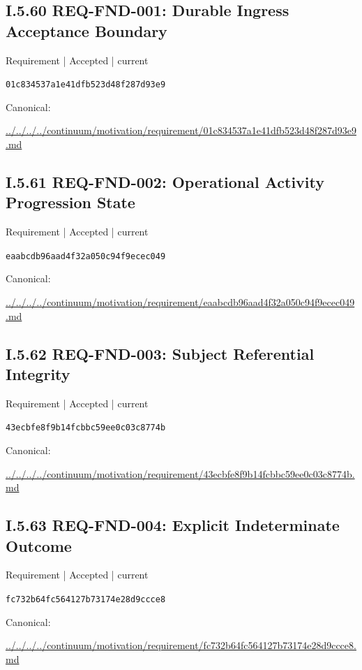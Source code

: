 \documentclass[10pt,a4paper]{article}
\begin{document}
\subsection*{I.5.60 REQ-FND-001: Durable Ingress Acceptance Boundary}
\label{element-01c834537a1e41dfb523d48f287d93e9}
{\small Requirement | Accepted | current}\par
\texttt{01c834537a1e41dfb523d48f287d93e9}\par
Canonical: \par
{\footnotesize\url{../../../../continuum/motivation/requirement/01c834537a1e41dfb523d48f287d93e9.md}}\par
\subsection*{I.5.61 REQ-FND-002: Operational Activity Progression State}
\label{element-eaabcdb96aad4f32a050c94f9ecec049}
{\small Requirement | Accepted | current}\par
\texttt{eaabcdb96aad4f32a050c94f9ecec049}\par
Canonical: \par
{\footnotesize\url{../../../../continuum/motivation/requirement/eaabcdb96aad4f32a050c94f9ecec049.md}}\par
\subsection*{I.5.62 REQ-FND-003: Subject Referential Integrity}
\label{element-43ecbfe8f9b14fcbbc59ee0c03c8774b}
{\small Requirement | Accepted | current}\par
\texttt{43ecbfe8f9b14fcbbc59ee0c03c8774b}\par
Canonical: \par
{\footnotesize\url{../../../../continuum/motivation/requirement/43ecbfe8f9b14fcbbc59ee0c03c8774b.md}}\par
\subsection*{I.5.63 REQ-FND-004: Explicit Indeterminate Outcome}
\label{element-fc732b64fc564127b73174e28d9ccce8}
{\small Requirement | Accepted | current}\par
\texttt{fc732b64fc564127b73174e28d9ccce8}\par
Canonical: \par
{\footnotesize\url{../../../../continuum/motivation/requirement/fc732b64fc564127b73174e28d9ccce8.md}}\par
\end{document}
